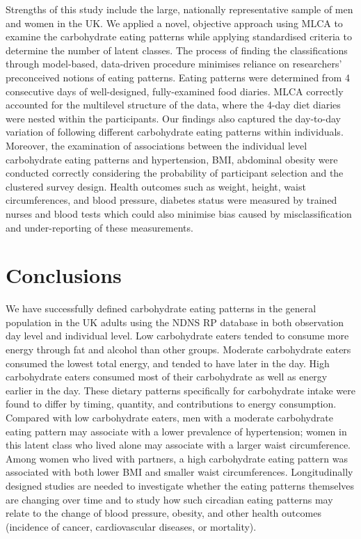 Strengths of this study include the large, nationally representative sample of men and women in the UK. We applied a novel, objective approach using MLCA to examine the carbohydrate eating patterns while applying standardised criteria to determine the number of latent classes. The process of finding the classifications through model-based, data-driven procedure minimises reliance on researchers' preconceived notions of eating patterns. Eating patterns were determined from 4 consecutive days of well-designed, fully-examined food diaries. MLCA correctly accounted for the multilevel structure of the data, where the 4-day diet diaries were nested within the participants. Our findings also captured the day-to-day variation of following different carbohydrate eating patterns within individuals. Moreover, the examination of associations between the individual level carbohydrate eating patterns and hypertension, BMI, abdominal obesity were conducted correctly considering the probability of participant selection and the clustered survey design. Health outcomes such as weight, height, waist circumferences, and blood pressure, diabetes status were measured by trained nurses and blood tests which could also minimise bias caused by misclassification and under-reporting of these measurements.

\section{Conclusions}

We have successfully defined carbohydrate eating patterns in the general population in the UK adults using the NDNS RP database in both observation day level and individual level. Low carbohydrate eaters tended to consume more energy through fat and alcohol than other groups. Moderate carbohydrate eaters consumed the lowest total energy, and tended to have later in the day. High carbohydrate eaters consumed most of their carbohydrate as well as energy earlier in the day. These dietary patterns specifically for carbohydrate intake were found to differ by timing, quantity, and contributions to energy consumption. Compared with low carbohydrate eaters, men with a moderate carbohydrate eating pattern may associate with a lower prevalence of hypertension; women in this latent class who lived alone may associate with a larger waist circumference. Among women who lived with partners, a high carbohydrate eating pattern was associated with both lower BMI and smaller waist circumferences. Longitudinally designed studies are needed to investigate whether the eating patterns themselves are changing over time and to study how such circadian eating patterns may relate to the change of blood pressure, obesity, and other health outcomes (incidence of cancer, cardiovascular diseases, or mortality).